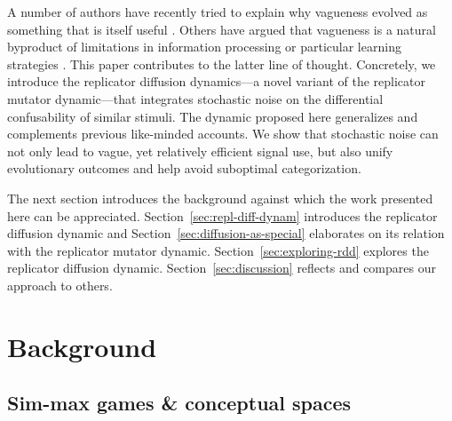 \documentclass[fleqn,reqno,10pt]{article}
\begin{document}
A number of authors have recently tried to explain why vagueness
evolved as something that is itself useful
\citep[e.g.][]{Jaegherde-Jaegher2003:A-Game-Theoreti,Deemter2009:Utility-and-Lan,BlumeBoard2013:Intentional-Vag}.
Others have argued that vagueness is a natural byproduct of
limitations in information processing or particular learning
strategies
\citep[e.g.][]{FrankeJager2010:Vagueness-Signa,OConnor2013:The-Evolution-o}. This
paper contributes to the latter line of thought. Concretely, we
introduce the replicator diffusion dynamics---a novel variant of the
replicator mutator dynamic---that integrates stochastic noise on the
differential confusability of similar stimuli. The dynamic proposed
here generalizes and complements previous like-minded accounts. We
show that stochastic noise can not only lead to vague, yet relatively
efficient signal use, but also unify evolutionary outcomes and
help avoid suboptimal categorization.

The next section introduces the background against which the work
presented here can be appreciated. Section~\ref{sec:repl-diff-dynam}
introduces the replicator diffusion dynamic and Section~\ref{sec:diffusion-as-special}
elaborates on its relation with the replicator mutator
dynamic. Section~\ref{sec:exploring-rdd} explores the replicator
diffusion dynamic. Section~\ref{sec:discussion} reflects and compares
our approach to others.

\section{Background}
\label{sec:background}


\subsection{Sim-max games \& conceptual spaces}
\end{document}
